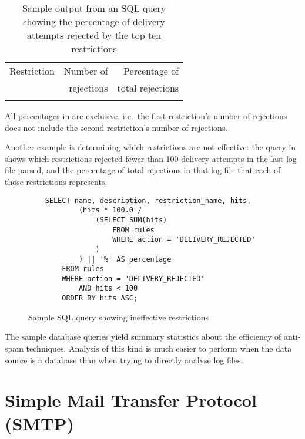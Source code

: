 \begin{table}[thbp]
    \caption{Sample output from an SQL query showing the percentage of
    delivery attempts rejected by the top ten restrictions}
    \empty{}\label{Sample output from SQL query}
    \begin{tabular}[]{lrr}
        \tabletopline{}%
        Restriction & Number of  & Percentage of    \\
                    & rejections & total rejections \\
        \tablemiddleline{}%
        
        \tablebottomline{}%
    \end{tabular}

    All percentages in  are
    exclusive, i.e.\ the first restriction's number of rejections does not
    include the second restriction's number of rejections.

\end{table}


Another example is determining which restrictions are not effective: the
query in 
shows which restrictions rejected fewer than 100 delivery attempts in the
last log file parsed, and the percentage of total rejections in that log
file that each of those restrictions represents.

\begin{figure}[thbp]
    \caption{Sample SQL query showing ineffective restrictions}
    \empty{}\label{Sample SQL query showing ineffective restrictions}
    \begin{verbatim}
    SELECT name, description, restriction_name, hits,
            (hits * 100.0 /
                (SELECT SUM(hits)
                    FROM rules
                    WHERE action = 'DELIVERY_REJECTED'
                )
            ) || '%' AS percentage
        FROM rules
        WHERE action = 'DELIVERY_REJECTED'
            AND hits < 100
        ORDER BY hits ASC;
    \end{verbatim}
\end{figure}

The sample database queries yield summary statistics about the efficiency of
anti-spam techniques.  Analysis of this kind is much easier to perform when
the data source is a database than when trying to directly analyse log
files.

\section{Simple Mail Transfer Protocol (SMTP)}

